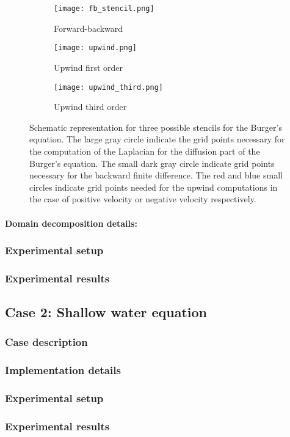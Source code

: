 \begin{figure}[!htbp]
\centering
\begin{subfigure}{.3\textwidth}
  \centering
  \texttt{[image: fb\_stencil.png]}
  \caption{Forward-backward}
  \label{fig:fb_stencil}
\end{subfigure}%
\begin{subfigure}{.3\textwidth}
  \centering
  \texttt{[image: upwind.png]}
  \caption{Upwind first order}
  \label{fig:upwind_stencil}
\end{subfigure}
\begin{subfigure}{.3\textwidth}
  \centering
  \texttt{[image: upwind\_third.png]}
  \caption{Upwind third order}
  \label{fig:upwind_third_stencil}
\end{subfigure}
\caption{Schematic representation for three possible stencils for the Burger's equation. The large gray circle indicate the grid points necessary for the computation of the Laplacian for the diffusion part of the Burger's equation. The small dark gray circle indicate grid points necessary for the backward finite difference. The red and blue small circles indicate grid points needed for the upwind computations in the case of positive velocity or negative velocity respectively.}
\label{fig:burger_stencils}
\end{figure}

\paragraph{Domain decomposition details: }

\subsubsection{Experimental setup}

\subsubsection{Experimental results}


\subsection{Case 2: Shallow water equation}

\subsubsection{Case description}

\subsubsection{Implementation details}

\subsubsection{Experimental setup}

\subsubsection{Experimental results}
